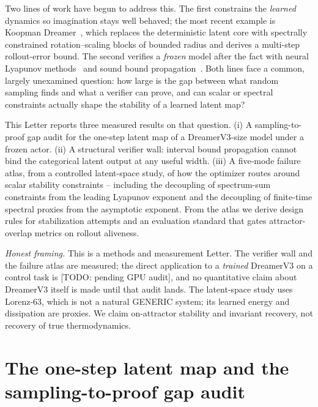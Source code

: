 \documentclass[11pt]{article}
\begin{document}
Two lines of work have begun to address this. The first constrains the
\emph{learned} dynamics so imagination stays well behaved; the most recent
example is Koopman Dreamer~\cite{koopman2026}, which replaces the
deterministic latent core with spectrally constrained rotation--scaling
blocks of bounded radius and derives a multi-step rollout-error bound. The
second verifies a \emph{frozen} model after the fact with neural Lyapunov
methods~\cite{chang2019,dawson2023} and sound bound
propagation~\cite{zhang2018crown,xu2020autolirpa}. Both lines face a common,
largely unexamined question: how large is the gap between what random
sampling finds and what a verifier can prove, and can scalar or spectral
constraints actually shape the stability of a learned latent map?

This Letter reports three measured results on that question. (i) A
sampling-to-proof gap audit for the one-step latent map of a DreamerV3-size
model under a frozen actor. (ii) A structural verifier wall: interval bound
propagation cannot bind the categorical latent output at any useful width.
(iii) A five-mode failure atlas, from a controlled latent-space study, of
how the optimizer routes around scalar stability constraints -- including
the decoupling of spectrum-sum constraints from the leading Lyapunov
exponent and the decoupling of finite-time spectral proxies from the
asymptotic exponent. From the atlas we derive design rules for stabilization
attempts and an evaluation standard that gates attractor-overlap metrics on
rollout aliveness.

\emph{Honest framing.} This is a methods and measurement Letter. The verifier
wall and the failure atlas are measured; the direct application to a
\emph{trained} DreamerV3 on a control task is [TODO: pending GPU audit], and
no quantitative claim about DreamerV3 itself is made until that audit lands.
The latent-space study uses Lorenz-63, which is not a natural GENERIC
system; its learned energy and dissipation are proxies. We claim
on-attractor stability and invariant recovery, not recovery of true
thermodynamics.

\section{The one-step latent map and the sampling-to-proof gap audit}
\end{document}
